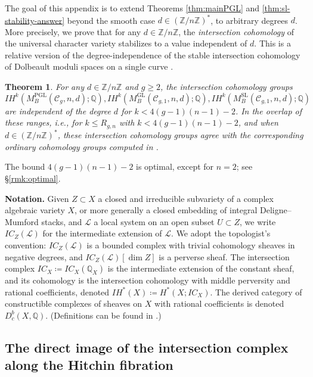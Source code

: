 \documentclass[11pt,reqno]{amsart}
\theoremstyle{plain} %
\newtheorem{theorem}{Theorem}[section]
\theoremstyle{definition}
\newcommand{\QQ}{\mathbb{Q}}
\newcommand{\C}{\mathcal{C}}
\newcommand{\ZZ}{\mathbb{Z}}
\DeclareMathOperator{\GL}{GL}
\DeclareMathOperator{\SL}{SL}
\DeclareMathOperator{\PGL}{PGL}
\newcommand{\IH}{I\!H}
\newcommand{\IC}{IC}
\begin{document}
The goal of this appendix is to extend Theorems \ref{thm:mainPGL} and \ref{thm:sl-stability-answer} beyond the smooth case $d \in (\ZZ/n\ZZ)^*$, to arbitrary degrees $d$. More precisely, we prove that for any $d \in \ZZ/n\ZZ$, the \textit{intersection cohomology} of the universal character variety stabilizes to a value independent of $d$. This is a relative version of the degree-independence of the stable intersection cohomology of Dolbeault moduli spaces on a single curve  \cite[Proposition~1.9]{MM}. 

\begin{theorem}\label{thm:mainappendix} 
    For any $d \in \ZZ/n\ZZ$ and $g\geq 2$, the intersection cohomology groups \[\IH^k(M^{\PGL}_B(\C_{g},n,d); \QQ), \IH^k(M^{\GL}_B(\C_{g,1},n,d); \QQ), \IH^k(M^{\SL}_B(\C_{g,1},n,d); \QQ)
    \] are independent of the degree $d$ for 
    $k < 4(g-1)(n-1)-2$. 
    In the overlap of these ranges, i.e., for $k \le R_{g,n}$ with $k < 4(g-1)(n-1)-2$, and when $d \in (\ZZ/n\ZZ)^*$, these intersection cohomology groups agree with the corresponding ordinary cohomology groups computed in .
\end{theorem}



\noindent The bound $4(g-1)(n-1)-2$ is optimal, except for $n=2$; see \S \ref{rmk:optimal}. 


\vspace{0.1 cm}

\noindent\textbf{Notation.} Given $Z \subset X$ a closed and irreducible subvariety of a complex algebraic variety $X$, or more generally a closed embedding of integral Deligne--Mumford stacks, and $\mathcal{L}$ a local system on an open subset $U \subset Z$, we write $\IC_Z(\mathcal{L})$ for the intermediate extension of $\mathcal{L}$. We adopt the topologist's convention: $\IC_Z(\mathcal{L})$ is a bounded complex with trivial cohomology sheaves in negative degrees, and $\IC_Z(\mathcal{L})[\dim Z]$ is a perverse sheaf.
The intersection complex $\IC_X \coloneqq \IC_X( \QQ_X)$ is the intermediate extension of the constant sheaf, and its cohomology is the intersection cohomology with middle perversity and rational coefficients, denoted $\IH^*(X) \coloneqq H^*(X; \IC_X)$. The derived category of constructible complexes of sheaves on $X$ with rational coefficients is denoted $D^{b}_c(X, \QQ)
$. (Definitions can be found in \cite[\S 2]{dC-Migliorini}.)

\subsection{The direct image of the intersection complex along the Hitchin fibration}
\end{document}
